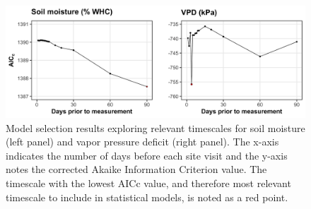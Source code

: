 \newpage
\begin{landscape}
    \begin{figure}
        \centering
        \includegraphics[scale = 0.07]{ch4_TXeco/figs/TXeco_figS2_aicc.png}
        \caption[Model selection results exploring relevant timescales for soil moisture and vapor pressure deficit]{Model selection results exploring relevant timescales for soil moisture (left panel) and vapor pressure deficit (right panel). The x-axis indicates the number of days before each site visit and the y-axis notes the corrected Akaike Information Criterion value. The timescale with the lowest AICc value, and therefore most relevant timescale to include in statistical models, is noted as a red point.}
        \label{fig:figure.c1}
    \end{figure}
\end{landscape}
\clearpage

